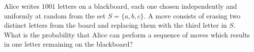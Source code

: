 Alice writes $1001$ letters on a blackboard, each one chosen independently and uniformly at random from the set $S=\{a, b, c\}$. A move consists of erasing two distinct letters from the board and replacing them with the third letter in $S$. What is the probability that Alice can perform a sequence of moves which results in one letter remaining on the blackboard?